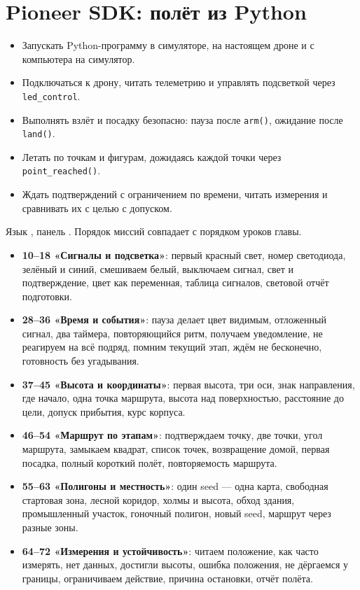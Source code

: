 \section{Pioneer SDK: полёт из Python}
\label{sec:python-sdk}

\begin{infobox}
\begin{itemize}
    \item Запускать Python-программу в симуляторе, на настоящем дроне и с компьютера на симулятор.
    \item Подключаться к дрону, читать телеметрию и управлять подсветкой через \texttt{led\_control}.
    \item Выполнять взлёт и посадку безопасно: пауза после \texttt{arm()}, ожидание после \texttt{land()}.
    \item Летать по точкам и фигурам, дожидаясь каждой точки через \texttt{point\_reached()}.
    \item Ждать подтверждений с ограничением по времени, читать измерения и сравнивать их с целью с допуском.
\end{itemize}
\end{infobox}

\begin{missionbox}
Язык , панель . Порядок миссий совпадает с порядком уроков главы.
\begin{itemize}
    \item \textbf{10--18 «Сигналы и подсветка»}: первый красный свет, номер светодиода, зелёный и синий, смешиваем белый, выключаем сигнал, свет и подтверждение, цвет как переменная, таблица сигналов, световой отчёт подготовки.
    \item \textbf{28--36 «Время и события»}: пауза делает цвет видимым, отложенный сигнал, два таймера, повторяющийся ритм, получаем уведомление, не реагируем на всё подряд, помним текущий этап, ждём не бесконечно, готовность без угадывания.
    \item \textbf{37--45 «Высота и координаты»}: первая высота, три оси, знак направления, где начало, одна точка маршрута, высота над поверхностью, расстояние до цели, допуск прибытия, курс корпуса.
    \item \textbf{46--54 «Маршрут по этапам»}: подтверждаем точку, две точки, угол маршрута, замыкаем квадрат, список точек, возвращение домой, первая посадка, полный короткий полёт, повторяемость маршрута.
    \item \textbf{55--63 «Полигоны и местность»}: один seed --- одна карта, свободная стартовая зона, лесной коридор, холмы и высота, обход здания, промышленный участок, гоночный полигон, новый seed, маршрут через разные зоны.
    \item \textbf{64--72 «Измерения и устойчивость»}: читаем положение, как часто измерять, нет данных, достигли высоты, ошибка положения, не дёргаемся у границы, ограничиваем действие, причина остановки, отчёт полёта.
\end{itemize}
\end{missionbox}

